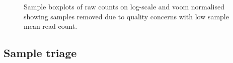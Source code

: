 \begin{figure}[!ht]
         \begin{center}
%
%
    \end{center}
  \caption[Read count sample mean]{\textbf{} Sample boxplots of raw counts on log-scale and voom normalised showing samples removed due to quality concerns with low sample mean read count.}
\label{fig:boxplot}
\end{figure}


\subsection{Sample triage}

